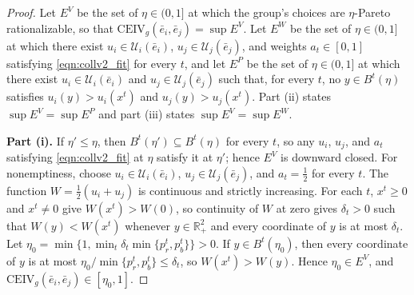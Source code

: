 \documentclass[11 pt]{article}
\begin{document}
\begin{proof}
Let $E^{V}$ be the set of $\eta \in (0,1]$ at which the group's choices are $\eta$-Pareto rationalizable, so that $\mathrm{CEIV}_{g}(\bar e_{i}, \bar e_{j}) = \sup E^{V}$. Let $E^{W}$ be the set of $\eta \in (0,1]$ at which there exist $u_{i} \in \mathcal{U}_{i}(\bar e_{i})$, $u_{j} \in \mathcal{U}_{j}(\bar e_{j})$, and weights $a_{t} \in [0,1]$ satisfying \eqref{eqn:collv2_fit} for every $t$, and let $E^{P}$ be the set of $\eta \in (0,1]$ at which there exist $u_{i} \in \mathcal{U}_{i}(\bar e_{i})$ and $u_{j} \in \mathcal{U}_{j}(\bar e_{j})$ such that, for every $t$, no $y \in B^{t}(\eta)$ satisfies $u_{i}(y) > u_{i}(x^{t})$ and $u_{j}(y) > u_{j}(x^{t})$. Part (ii) states $\sup E^{V} = \sup E^{P}$ and part (iii) states $\sup E^{V} = \sup E^{W}$.

\textbf{Part (i).} If $\eta' \leq \eta$, then $B^{t}(\eta') \subseteq B^{t}(\eta)$ for every $t$, so any $u_{i}$, $u_{j}$, and $a_{t}$ satisfying \eqref{eqn:collv2_fit} at $\eta$ satisfy it at $\eta'$; hence $E^{V}$ is downward closed. For nonemptiness, choose $u_{i} \in \mathcal{U}_{i}(\bar e_{i})$, $u_{j} \in \mathcal{U}_{j}(\bar e_{j})$, and $a_{t} = \tfrac{1}{2}$ for every $t$. The function $W = \tfrac{1}{2}(u_{i} + u_{j})$ is continuous and strictly increasing. For each $t$, $x^{t} \geq 0$ and $x^{t} \neq 0$ give $W(x^{t}) > W(0)$, so continuity of $W$ at zero gives $\delta_{t} > 0$ such that $W(y) < W(x^{t})$ whenever $y \in \mathbb{R}^{2}_{+}$ and every coordinate of $y$ is at most $\delta_{t}$. Let $\eta_{0} = \min \bigl\{ 1, \min_{t} \delta_{t} \min\{ p^{t}_{r}, p^{t}_{b} \} \bigr\} > 0$. If $y \in B^{t}(\eta_{0})$, then every coordinate of $y$ is at most $\eta_{0}/\min\{ p^{t}_{r}, p^{t}_{b} \} \leq \delta_{t}$, so $W(x^{t}) > W(y)$. Hence $\eta_{0} \in E^{V}$, and $\mathrm{CEIV}_{g}(\bar e_{i}, \bar e_{j}) \in [\eta_{0}, 1]$.


\end{proof}
\end{document}
